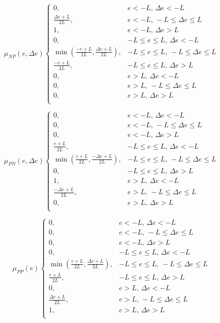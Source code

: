 \begin{equation}
\mu_{NP}(e,\Delta e)\begin{cases}
    0,& e<-L,\,\Delta e<-L\\
    \frac{\Delta e+L}{2L},& e<-L,\,-L\leq \Delta e\leq L\\
    1,& e<-L,\,\Delta e>L\\
    0,& -L\leq e\leq L,\,\Delta e<-L\\
    \min{\left(\frac{-e+L}{2L},\frac{\Delta e+L}{2L}\right)},& -L\leq e\leq L,\,-L\leq \Delta e\leq L\\
    \frac{-e+L}{2L},& -L\leq e\leq L,\,\Delta e>L\\
    0,& e>L,\,\Delta e<-L\\
    0,& e>L,\,-L\leq \Delta e\leq L\\
    0,& e>L,\,\Delta e>L\\
\end{cases}
\end{equation}

\begin{equation}
\mu_{PN}(e,\Delta e)\begin{cases}
    0,& e<-L,\,\Delta e<-L\\
    0,& e<-L,\,-L\leq \Delta e\leq L\\
    0,& e<-L,\,\Delta e>L\\
    \frac{e+L}{2L},& -L\leq e\leq L,\,\Delta e<-L\\
    \min{\left(\frac{e+L}{2L},\frac{-\Delta e+L}{2L}\right)},& -L\leq e\leq L,\,-L\leq \Delta e\leq L\\
    0,& -L\leq e\leq L,\,\Delta e>L\\
    1,& e>L,\,\Delta e<-L\\
    \frac{-\Delta e+L}{2L},& e>L,\,-L\leq \Delta e\leq L\\
    0,& e>L,\,\Delta e>L\\
\end{cases}
\end{equation}

\begin{equation}
\mu_{PP}(e)\begin{cases}
    0,& e<-L,\,\Delta e<-L\\
    0,& e<-L,\,-L\leq \Delta e\leq L\\
    0,& e<-L,\,\Delta e>L\\
    0,& -L\leq e\leq L,\,\Delta e<-L\\
    \min{\left(\frac{e+L}{2L},\frac{\Delta e+L}{2L}\right)},& -L\leq e\leq L,\,-L\leq \Delta e\leq L\\
    \frac{e+L}{2L},& -L\leq e\leq L,\,\Delta e>L\\
    0,& e>L,\,\Delta e<-L\\
    \frac{\Delta e+L}{2L},& e>L,\,-L\leq \Delta e\leq L\\
    1,& e>L,\,\Delta e>L\\
\end{cases}
\end{equation}

